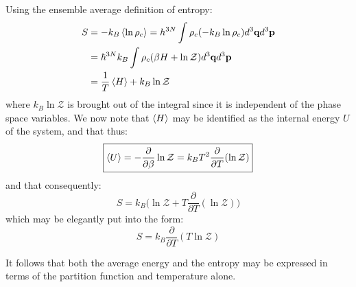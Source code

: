 \documentclass[a4paper,11pt,oneside]{book}
\begin{document}
Using the ensemble average definition of entropy:
\begin{align}
    S &= -k_B\braket{ \ln \rho_c} = h^{3N} \int \rho_c (-k_B \ln \rho_c) d^3 \textbf{q}d^3 \textbf{p}\\
    &=\hbar^{3N}k_B \int \rho_c (\beta H + \ln \mathcal{Z}) d^3 \textbf{q} d^3 \textbf{p}\\
    &= \frac{1}{T} \braket{H} + k_B\ln \mathcal{Z} 
\end{align}
where $k_B \ln \mathcal{Z}$ is brought out of the integral since it is independent of the phase space variables. We now note that $\braket{H}$ may be identified as the internal energy $U$ of the system, and that thus:
\begin{equation}
    \boxed{\braket{U}  = -\frac{\partial}{\partial \beta} \ln \mathcal{Z} = k_B T^2 \frac{\partial}{\partial T} (\ln \mathcal{Z}) }
\end{equation}
and that consequently:
\begin{equation}
    S = k_B \bigg(\ln \mathcal{Z} +T \frac{\partial}{\partial T} (\ln \mathcal{Z}) \bigg) 
\end{equation}
which may be elegantly put into the form:
\begin{equation}
   \boxed{S = k_B \frac{\partial}{\partial T}(T \ln \mathcal{Z})}
\end{equation}

It follows that both the average energy and the entropy may be expressed in terms of the partition function and temperature alone. 
\end{document}
